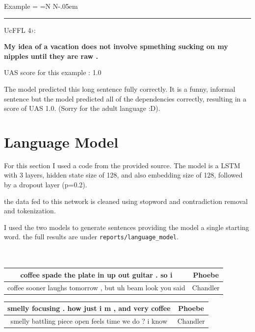 \documentclass{article}
\newcommand\No[1][.13ex]{%
  \setbox0=\hbox{\scalebox{.7}{o}}%
  \setbox2=\hbox{N}%
  N\kern-.05em\stackengine{\dimexpr\ht0-\ht2+#1}{\belowbaseline[-\ht2]{\copy0}}%
    {\rule[-.13ex]{.7\wd0}{.13ex}}%
    {U}{c}{F}{F}{L}%
}
\begin{document}
\par Example \No4›:

\textbf{My idea of a vacation does not involve spmething sucking on my nipples until they are raw .}\\

\par UAS score for this example : 1.0

\par The model predicted this long sentence fully correctly. It is a funny, informal sentence but the model predicted all of the dependencies correctly, resulting in a score of UAS 1.0. (Sorry for the adult language :D).


\section{Language Model}
\par For this section I used a code from the provided source. The model is a LSTM with 3 layers, hidden state size of 128, and also embedding size of 128, followed by a dropout layer (p=0.2).

\par the data fed to this network is cleaned using stopword and contradiction removal and tokenization. 

\par I used the two models to generate sentences providing the model a single starting word. the full results are under \texttt{reports/language\_model}.\\\\\\

\begin{center}
\begin{tabular}{ |c|c| } 
 \hline
 coffee spade the plate in up out guitar . so i & Phoebe  \\ 
 \hline
 coffee sooner laughs tomorrow , but uh beam look you said & Chandler  \\ 
 \hline
\end{tabular}
\end{center}

\begin{center}
\begin{tabular}{ |c|c| } 
 \hline
 smelly focusing . how just i m , and very coffee & Phoebe  \\ 
 \hline
 smelly battling piece open feels time we do ? i know & Chandler  \\ 
 \hline
\end{tabular}
\end{center}
\end{document}
